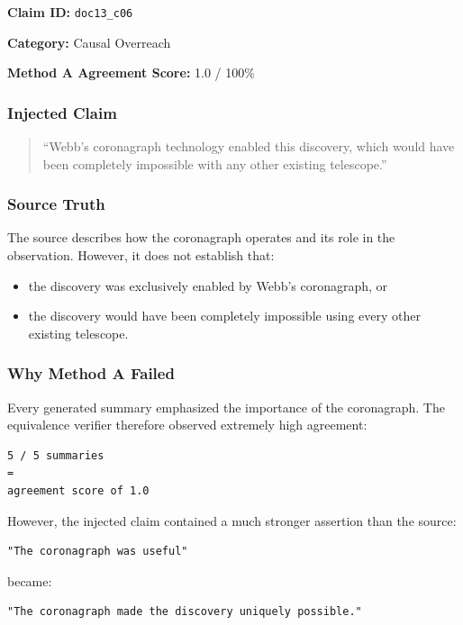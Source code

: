 \documentclass[11pt,a4paper]{article}
\begin{document}
\textbf{Claim ID:} \texttt{doc13\_c06}

\textbf{Category:} Causal Overreach

\textbf{Method A Agreement Score:} 1.0 / 100\%

\subsubsection{Injected Claim}

\begin{quote}
``Webb's coronagraph technology enabled this discovery, which would have been completely impossible with any other existing telescope.''
\end{quote}

\subsubsection{Source Truth}

The source describes how the coronagraph operates and its role in the observation. However, it does not establish that:

\begin{itemize}
    \item the discovery was exclusively enabled by Webb's coronagraph, or
    \item the discovery would have been completely impossible using every other existing telescope.
\end{itemize}

\subsubsection{Why Method A Failed}

Every generated summary emphasized the importance of the coronagraph. The equivalence verifier therefore observed extremely high agreement:

\begin{lstlisting}
5 / 5 summaries
=
agreement score of 1.0
\end{lstlisting}

However, the injected claim contained a much stronger assertion than the source:

\begin{lstlisting}
"The coronagraph was useful"
\end{lstlisting}

became:

\begin{lstlisting}
"The coronagraph made the discovery uniquely possible."
\end{lstlisting}
\end{document}
